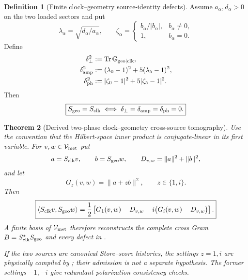 \documentclass[11pt]{article}
\newtheorem{theorem}{Theorem}[section]
\theoremstyle{definition}
\newtheorem{definition}[theorem]{Definition}
\theoremstyle{remark}
\newcommand{\Tr}{\operatorname{Tr}}
\newcommand{\norm}[1]{\lVert#1\rVert}
\begin{document}
\begin{definition}[Finite clock--geometry source-identity defects]
\label{def:source-identity-defects-master}
Assume $a_\alpha,d_\alpha>0$ on the two loaded sectors and put
\[
  \lambda_\alpha=\sqrt{d_\alpha/a_\alpha},
  \qquad
  \zeta_\alpha=
  \begin{cases}
    b_\alpha/|b_\alpha|,&b_\alpha\ne0,\\
    1,&b_\alpha=0.
  \end{cases}
\]
Define
\begin{align}
  \delta_\perp^2
  &:=\Tr\mathbb G_{{\rm geo}\mid{\rm clk}},
  \label{eq:source-defect-perp-master}\\
  \delta_{\rm amp}^2
  &:=(\lambda_0-1)^2+5(\lambda_5-1)^2,
  \label{eq:source-defect-amp-master}\\
  \delta_{\rm ph}^2
  &:=|\zeta_0-1|^2+5|\zeta_5-1|^2.
  \label{eq:source-defect-phase-master}
\end{align}
Then
\begin{equation}
  \boxed{
  S_{\rm geo}=S_{\rm clk}
  \iff
  \delta_\perp=\delta_{\rm amp}=\delta_{\rm ph}=0.}
  \label{eq:source-defect-equality-master}
\end{equation}
\end{definition}

\begin{theorem}[Derived two-phase clock--geometry cross-source tomography]
\label{thm:cross-source-tomography-master}
Use the convention that the Hilbert-space inner product is conjugate-linear
in its first variable.  For $v,w\in\mathcal V_{\rm met}$ put
\[
 a=S_{\rm clk}v,\qquad b=S_{\rm geo}w,\qquad
 D_{v,w}=\norm a^2+\norm b^2,
\]
and let
\[
 G_z(v,w)=\norm{a+zb}^2,\qquad z\in\{1,i\}.
\]
Then
\begin{equation}
 \boxed{
 \langle S_{\rm clk}v,S_{\rm geo}w\rangle
 =\frac12\left[
   G_1(v,w)-D_{v,w}
   -i\bigl(G_i(v,w)-D_{v,w}\bigr)
 \right].}
 \label{eq:cross-source-two-phase-master}
\end{equation}
A finite basis of $\mathcal V_{\rm met}$ therefore reconstructs the complete
cross Gram $B=S_{\rm clk}^*S_{\rm geo}$ and every defect in
.

If the two sources are canonical Store--score histories, the settings
$z=1,i$ are physically compiled by
;
their admission is not a separate hypothesis.  The former settings
$-1,-i$ give redundant polarization consistency checks.
\end{theorem}
\end{document}
